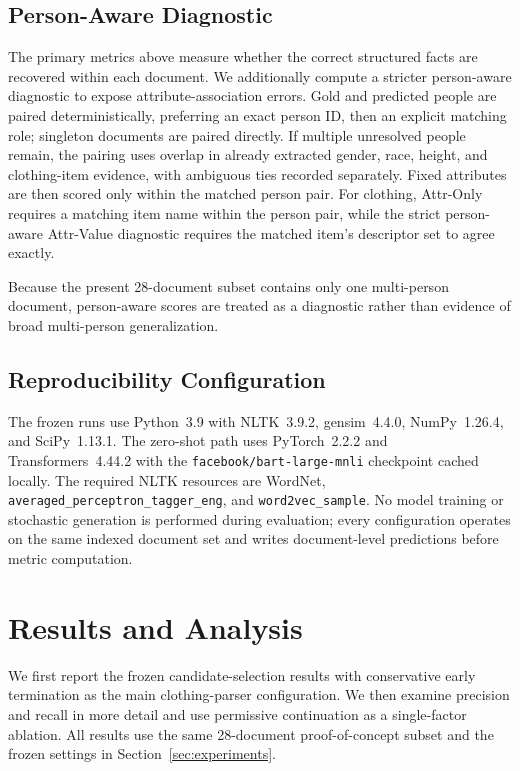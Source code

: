 \documentclass[sigconf,nonacm]{acmart}
\begin{document}
\subsection{Person-Aware Diagnostic}
\label{subsec:person-aware-metric}

The primary metrics above measure whether the correct structured facts are
recovered within each document.  We additionally compute a stricter
person-aware diagnostic to expose attribute-association errors.  Gold and
predicted people are paired deterministically, preferring an exact person ID,
then an explicit matching role; singleton documents are paired directly.  If
multiple unresolved people remain, the pairing uses overlap in already
extracted gender, race, height, and clothing-item evidence, with ambiguous ties
recorded separately.  Fixed attributes are then scored only within the matched
person pair.  For clothing, Attr-Only requires a matching item name within the
person pair, while the strict person-aware Attr-Value diagnostic requires the
matched item's descriptor set to agree exactly.

Because the present 28-document subset contains only one multi-person document,
person-aware scores are treated as a diagnostic rather than evidence of broad
multi-person generalization.

\subsection{Reproducibility Configuration}
\label{subsec:experimental-reproducibility}

The frozen runs use Python~3.9 with NLTK~3.9.2, gensim~4.4.0,
NumPy~1.26.4, and SciPy~1.13.1.  The zero-shot path uses
PyTorch~2.2.2 and Transformers~4.44.2 with the
\texttt{facebook/bart-large-mnli} checkpoint cached locally.  The required
NLTK resources are WordNet, \texttt{averaged\_perceptron\_tagger\_eng}, and
\texttt{word2vec\_sample}.  No model training or stochastic generation is
performed during evaluation; every configuration operates on the same indexed
document set and writes document-level predictions before metric computation.

\section{Results and Analysis}
\label{sec:results}

We first report the frozen candidate-selection results with conservative early
termination as the main clothing-parser configuration.  We then examine
precision and recall in more detail and use permissive continuation as a
single-factor ablation.  All results use the same 28-document proof-of-concept
subset and the frozen settings in Section~\ref{sec:experiments}.
\end{document}
